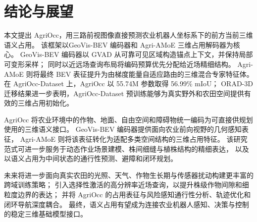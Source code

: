 \section{结论与展望}\label{sec:conclusion}

本文提出 AgriOcc，用三路前视图像直接预测农业机器人坐标系下的前方当前三维语义占用。
该框架以GeoVis-BEV 编码器和 Agri-AMoE 三维占用解码器为核心。
GeoVis-BEV 编码器以 GVAD 从可靠可见区域构造锚点上下文，并保持局部可变形采样；
同时以近远场查询布局将编码预算优先分配给近场精细结构。
Agri-AMoE 则将最终 BEV 表征提升为由梯度能量自适应路由的三维混合专家特征体。
在 AgriOcc-Dataset 上，AgriOcc 以 55.74M 参数取得 56.99\% mIoU；
ORAD-3D 迁移结果进一步表明，AgriOcc-Dataset 预训练能够为真实野外和农田空间提供有效的三维占用初始化。

AgriOcc 将农业环境中的作物、地面、自由空间和障碍物统一编码为可直接供规划使用的三维语义接口。
GeoVis-BEV 编码器提供面向农业前向视野的几何感知表征，
Agri-AMoE 则将该表征转化为适配多类空间结构的三维占用特征。
该研究范式可进一步服务于动态作业场景建模、株间细缝与植株结构的精细表达，
以及以语义占用为中间状态的通行性预测、避障和闭环规划。

未来将进一步面向真实农田的光照、天气、作物生长期与传感器扰动构建更丰富的跨域训练策略；
引入选择性激活的高分辨率近场查询，以提升株级作物间隙和细粒度边界的表达；
并将 AgriOcc 的占用表征与风险感知通行性分析、轨迹优化和闭环导航深度耦合。
最终，语义占用有望成为连接农业机器人感知、决策与控制的稳定三维基础模型接口。
